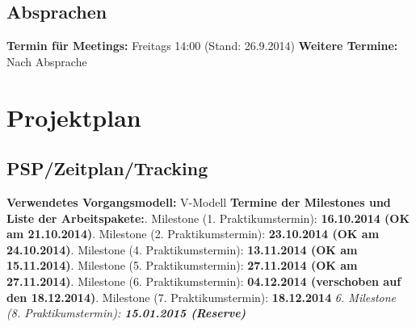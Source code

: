 \documentclass[oneside,a4paper,titlepage]{scrartcl}              %
\begin{document}
\subsection{Absprachen}
\textbf{Termin für Meetings:} Freitags 14:00 (Stand: 26.9.2014)\newline
\textbf{Weitere Termine:} Nach Absprache


\section{Projektplan}

\subsection{PSP/Zeitplan/Tracking}
\textbf{Verwendetes Vorgangsmodell:} V-Modell\newline\newline
\textbf{Termine der Milestones und Liste der Arbeitspakete:}\newline{}. Milestone (1. Praktikumstermin): \textbf{16.10.2014 \textbar \space (OK am 21.10.2014)}. Milestone (2. Praktikumstermin): \textbf{23.10.2014 \textbar \space (OK am 24.10.2014)}. Milestone (4. Praktikumstermin): \textbf{13.11.2014 \textbar \space (OK am 15.11.2014)}. Milestone (5. Praktikumstermin): \textbf{27.11.2014 \textbar \space (OK am 27.11.2014)}. Milestone (6. Praktikumstermin): \textbf{04.12.2014 \textbar \space (verschoben auf den 18.12.2014)}. Milestone (7. Praktikumstermin): \textbf{18.12.2014}\newline
\textit{6. Milestone (8. Praktikumstermin): \textbf{15.01.2015 (Reserve)}}

\end{document}
